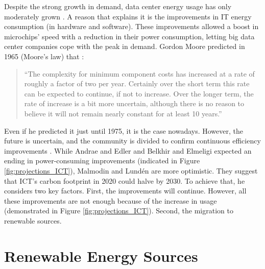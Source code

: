 Despite the strong growth in demand, data center energy usage has only moderately grown \cite{centres2022data}. A reason that explains it is the improvements in IT energy consumption (in hardware and software). These improvements allowed a boost in microchips' speed with a reduction in their power consumption, letting big data center companies cope with the peak in demand. Gordon Moore predicted in 1965 (Moore's law) that \cite{moore1965cramming}:

\begin{quote}
    ``The complexity for minimum component costs has increased at a rate of roughly a factor of two per year. Certainly over the short term this rate can be expected to continue, if not to increase. Over the longer term, the rate of increase is a bit more uncertain, although there is no reason to believe it will not remain nearly constant for at least 10 years.''
\end{quote}

Even if he predicted it just until 1975, it is the case nowadays. However, the future is uncertain, and the community is divided to confirm continuous efficiency improvements \cite{freitag2021climate}. While Andrae and Edler \cite{andrae2015global} and Belkhir and Elmeligi \cite{belkhir2018assessing} expected an ending in power-consuming improvements (indicated in Figure \ref{fig:projections_ICT}), Malmodin and Lundén \cite{malmodin2018energy} are more optimistic. They suggest that ICT’s carbon footprint in 2020 could halve by 2030. To achieve that, he considers two key factors. First, the improvements will continue. However, all these improvements are not enough because of the increase in usage (demonstrated in Figure \ref{fig:projections_ICT}). Second, the migration to renewable sources.


\section{Renewable Energy Sources}

